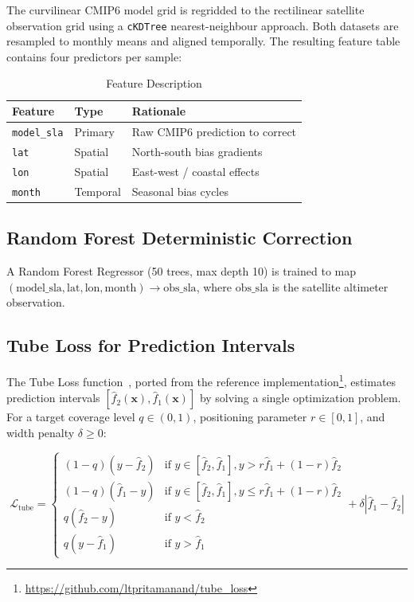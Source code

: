 \documentclass[conference]{IEEEtran}
\begin{document}
The curvilinear CMIP6 model grid is regridded to the rectilinear satellite observation grid using a \texttt{cKDTree} nearest-neighbour approach. Both datasets are resampled to monthly means and aligned temporally. The resulting feature table contains four predictors per sample:

\begin{table}[H]
\centering
\caption{Feature Description}
\label{tab:features}
\begin{tabular}{@{}lll@{}}
\toprule
\textbf{Feature} & \textbf{Type} & \textbf{Rationale} \\
\midrule
\texttt{model\_sla} & Primary & Raw CMIP6 prediction to correct \\
\texttt{lat} & Spatial & North-south bias gradients \\
\texttt{lon} & Spatial & East-west / coastal effects \\
\texttt{month} & Temporal & Seasonal bias cycles \\
\bottomrule
\end{tabular}
\end{table}

\subsection{Random Forest Deterministic Correction}

A Random Forest Regressor (50 trees, max depth 10) is trained to map $(\text{model\_sla}, \text{lat}, \text{lon}, \text{month}) \rightarrow \text{obs\_sla}$, where $\text{obs\_sla}$ is the satellite altimeter observation.

\subsection{Tube Loss for Prediction Intervals}

The Tube Loss function~\cite{anand2024}, ported from the reference implementation\footnote{\url{https://github.com/ltpritamanand/tube\_loss}}, estimates prediction intervals $[\hat{f}_2(\mathbf{x}), \hat{f}_1(\mathbf{x})]$ by solving a single optimization problem. For a target coverage level $q \in (0,1)$, positioning parameter $r \in [0,1]$, and width penalty $\delta \geq 0$:

\begin{equation}
\mathcal{L}_{\text{tube}} = 
\begin{cases}
(1-q)(y - \hat{f}_2) & \text{if } y \in [\hat{f}_2, \hat{f}_1], y > r\hat{f}_1 + (1-r)\hat{f}_2 \\
(1-q)(\hat{f}_1 - y) & \text{if } y \in [\hat{f}_2, \hat{f}_1], y \leq r\hat{f}_1 + (1-r)\hat{f}_2 \\
q(\hat{f}_2 - y) & \text{if } y < \hat{f}_2 \\
q(y - \hat{f}_1) & \text{if } y > \hat{f}_1
\end{cases}
+ \delta|\hat{f}_1 - \hat{f}_2|
\label{eq:tube}
\end{equation}
\end{document}
